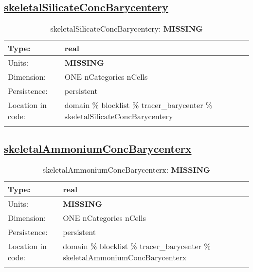 \subsection[skeletalSilicateConcBarycentery]{\hyperref[sec:var_tab_tracer_barycenter]{skeletalSilicateConcBarycentery}}
\label{subsec:var_sec_tracer_barycenter_skeletalSilicateConcBarycentery}
\begin{center}
\begin{longtable}{| p{2.0in} | p{4.0in} |}
        \hline 
        Type: & real \\
        \hline 
        Units: & {\bf \color{red} MISSING} \\
        \hline 
        Dimension: & ONE nCategories nCells \\
        \hline 
        Persistence: & persistent \\
        \hline 
         Location in code: & domain \% blocklist \% tracer\_barycenter \% skeletalSilicateConcBarycentery \\
         \hline 
    \caption{skeletalSilicateConcBarycentery: {\bf \color{red} MISSING}}
\end{longtable}
\end{center}
\subsection[skeletalAmmoniumConcBarycenterx]{\hyperref[sec:var_tab_tracer_barycenter]{skeletalAmmoniumConcBarycenterx}}
\label{subsec:var_sec_tracer_barycenter_skeletalAmmoniumConcBarycenterx}
\begin{center}
\begin{longtable}{| p{2.0in} | p{4.0in} |}
        \hline 
        Type: & real \\
        \hline 
        Units: & {\bf \color{red} MISSING} \\
        \hline 
        Dimension: & ONE nCategories nCells \\
        \hline 
        Persistence: & persistent \\
        \hline 
         Location in code: & domain \% blocklist \% tracer\_barycenter \% skeletalAmmoniumConcBarycenterx \\
         \hline 
    \caption{skeletalAmmoniumConcBarycenterx: {\bf \color{red} MISSING}}
\end{longtable}
\end{center}
